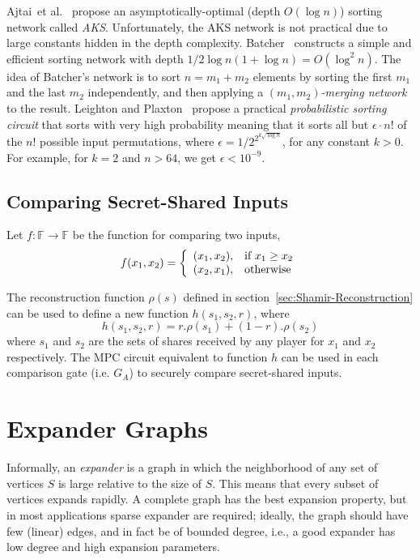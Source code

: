 \documentclass[11pt]{article}
\theoremstyle{plain}
\begin{document}
Ajtai~et al.~\cite{Ajtai:1983:SCL:61981.61982} propose an asymptotically-optimal
(depth $O(\log n)$) sorting network called \emph{AKS}. Unfortunately,
the AKS network is not practical due to large constants hidden in
the depth complexity. Batcher~\cite{Batcher:1968:SNA:1468075.1468121}
constructs a simple and efficient sorting network with depth $1/2\log n(1+\log n)=O(\log^{2}n)$.
The idea of Batcher's network is to sort $n=m_{1}+m_{2}$ elements
by sorting the first $m_{1}$ and the last $m_{2}$ independently,
and then applying a $(m_{1},m_{2})$\emph{-merging network} to the
result. Leighton and Plaxton~\cite{Leighton:1990:Sorting} propose
a practical \emph{probabilistic sorting circuit} that sorts with very
high probability meaning that it sorts all but $\epsilon\cdot n!$
of the $n!$ possible input permutations, where $\epsilon=1/2^{2^{k\sqrt{\log n}}}$,
for any constant $k>0$. For example, for $k=2$ and $n>64$, we get
$\epsilon<10^{-9}$.%

\subsection{Comparing Secret-Shared Inputs}

Let $f:\mathbb{F}\to\mathbb{F}$ be the function for comparing two
inputs, 
\[
f(x_{1},x_{2})=\left\{ \begin{array}{ll}
(x_{1},x_{2}), & \text{if \ensuremath{x_{1}\geq x_{2}}}\\
(x_{2},x_{1}), & \text{otherwise}
\end{array}\right.
\]

The reconstruction function $\rho(s)$ defined in section~\ref{sec:Shamir-Reconstruction}
can be used to define a new function $h(s_{1},s_{2},r)$, where 
\[
h(s_{1},s_{2},r)=r.\rho(s_{1})+(1-r).\rho(s_{2})
\]
where $s_{1}$ and $s_{2}$ are the sets of shares received by any
player for $x_{1}$ and $x_{2}$ respectively. The MPC circuit equivalent
to function $h$ can be used in each comparison gate (i.e. $G_{A}$)
to securely compare secret-shared inputs.


\section{Expander Graphs}

Informally, an \emph{expander} is a graph in which the neighborhood
of any set of vertices $S$ is large relative to the size of $S$.
This means that every subset of vertices expands rapidly. A complete
graph has the best expansion property, but in most applications sparse
expander are required; ideally, the graph should have few (linear)
edges, and in fact be of bounded degree, i.e., a good expander has
low degree and high expansion parameters. 
\end{document}
